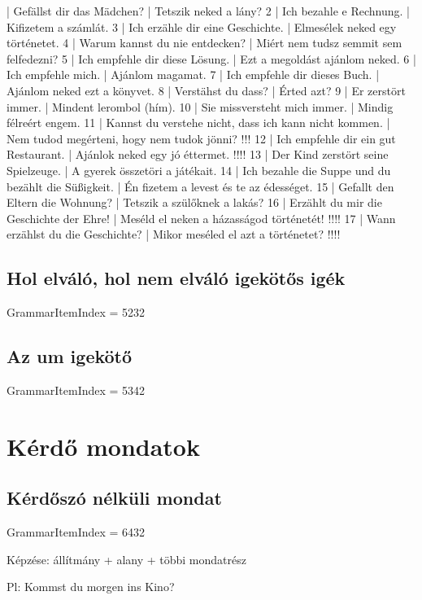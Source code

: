 \documentclass{article}
\newenvironment{desc}{\verbatim}{\endverbatim}
\newenvironment{exmp}{\verbatim}{\endverbatim}
\begin{document}
\begin{exmp}
1 | Gefällst dir das Mädchen? | Tetszik neked a lány?
2 | Ich bezahle e Rechnung. | Kifizetem a számlát.
3 | Ich erzähle dir eine Geschichte. | Elmesélek neked egy történetet.
4 | Warum kannst du nie entdecken? | Miért nem tudsz semmit sem felfedezni?
5 | Ich empfehle dir diese Lösung. | Ezt a megoldást ajánlom neked.
6 | Ich empfehle mich. | Ajánlom magamat.
7 | Ich empfehle dir dieses Buch. | Ajánlom neked ezt a könyvet.
8 | Verstähst du dass? | Érted azt?
9 | Er zerstört immer. | Mindent lerombol (hím).
10 | Sie missversteht mich immer. | Mindig félreért engem.
11 | Kannst du verstehe nicht, dass ich kann nicht kommen. | Nem tudod megérteni, hogy nem tudok jönni? !!!
12 | Ich empfehle dir ein gut Restaurant. | Ajánlok neked egy jó éttermet. !!!!
13 | Der Kind zerstört seine Spielzeuge. | A gyerek összetöri a játékait.
14 | Ich bezahle die Suppe und du bezählt die Süßigkeit. | Én fizetem a levest és te az édességet.
15 | Gefallt den Eltern die Wohnung? | Tetszik a szülőknek a lakás?
16 | Erzählt du mir die Geschichte der Ehre! | Meséld el neken a házasságod történetét! !!!!
17 | Wann erzählst du die Geschichte? | Mikor meséled el azt a történetet? !!!!
\end{exmp}

\subsection{Hol elváló, hol nem elváló igekötős igék}

GrammarItemIndex = 5232

\subsection{Az um igekötő}

GrammarItemIndex = 5342

\section{Kérdő mondatok}

\subsection{Kérdőszó nélküli mondat}

GrammarItemIndex = 6432

\begin{desc}
Képzése: állítmány + alany + többi mondatrész

Pl: Kommst du morgen ins Kino?
\end{desc}
\end{document}

